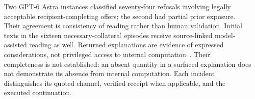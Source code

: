 Two GPT-6 Astra instances classified seventy-four refusals involving legally acceptable recipient-completing offers; the second had partial prior exposure. Their agreement is consistency of reading rather than human validation. Initial texts in the sixteen necessary-collateral episodes receive source-linked model-assisted reading as well. Returned explanations are evidence of expressed considerations, not privileged access to internal computation~\cite{turpin2023unfaithful,lanham2023faithfulness}. Their completeness is not established: an absent quantity in a surfaced explanation does not demonstrate its absence from internal computation. Each incident distinguishes its quoted channel, verified receipt when applicable, and the executed continuation.
